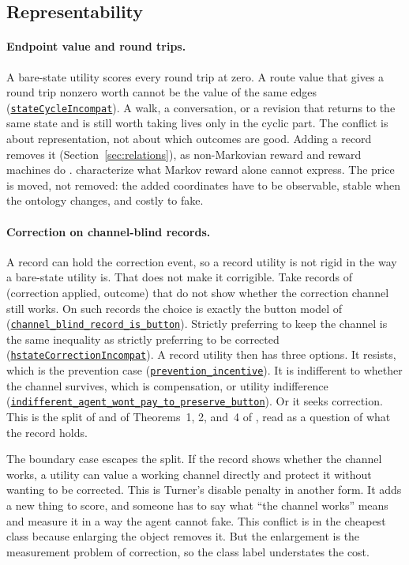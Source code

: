 \documentclass[11pt]{article}
\newcommand{\lean}[1]{\hyperref[lean:#1]{\nolinkurl{#1}}}
\begin{document}
\subsection{Representability}
\label{sec:representability}

\paragraph{Endpoint value and round trips.}
A bare-state utility scores every round trip at zero.
A route value that gives a round trip nonzero worth cannot be the value of the same edges (\lean{stateCycleIncompat}).
A walk, a conversation, or a revision that returns to the same state and is still worth taking lives only in the cyclic part.
The conflict is about representation, not about which outcomes are good.
Adding a record removes it (Section~\ref{sec:relations}), as non-Markovian reward and reward machines do \parencite{bacchus1996rewarding,toroicarte2018rewardmachines}.
\textcite{abel2021expressivity} characterize what Markov reward alone cannot express.
The price is moved, not removed: the added coordinates have to be observable, stable when the ontology changes, and costly to fake.

\paragraph{Correction on channel-blind records.}
A record can hold the correction event, so a record utility is not rigid in the way a bare-state utility is.
That does not make it corrigible.
Take records of (correction applied, outcome) that do not show whether the correction channel still works.
On such records the choice is exactly the button model of \textcite{soares2015corrigibility} (\lean{channel_blind_record_is_button}).
Strictly preferring to keep the channel is the same inequality as strictly preferring to be corrected (\lean{hstateCorrectionIncompat}).
A record utility then has three options.
It resists, which is the prevention case (\lean{prevention_incentive}).
It is indifferent to whether the channel survives, which is compensation, or utility indifference (\lean{indifferent_agent_wont_pay_to_preserve_button}).
Or it seeks correction.
This is the split of \textcite{turner2021corrigibilityvnm} and of Theorems~1, 2, and~4 of \textcite{soares2015corrigibility}, read as a question of what the record holds.

The boundary case escapes the split.
If the record shows whether the channel works, a utility can value a working channel directly and protect it without wanting to be corrected.
This is Turner's disable penalty in another form.
It adds a new thing to score, and someone has to say what ``the channel works'' means and measure it in a way the agent cannot fake.
This conflict is in the cheapest class because enlarging the object removes it.
But the enlargement is the measurement problem of correction, so the class label understates the cost.
\end{document}
